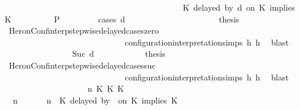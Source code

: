 \begin{isabellebody}
\ \ \ \ \ \ \ \ \ \ \ \ \ \ \ \ \ \ \ \ \ \ \ \ \ \ \ \ \ \ \ \ \ \ \ \ \ \ \ \ {\isasymturnstile}\ {\isasymPsi}\ {\isasymtriangleright}\ {\isacharparenleft}{\isacharparenleft}K\ delayed\ by\ d\ on\ K\ implies\ K\ {\isacharhash}\ {\isasymPhi}{\isacharparenright}{\isacharparenright}{\isacartoucheclose}\isanewline
\ \ \ \ \ \ \isamarkupfalse%
\ {\isacharquery}P\ \isanewline
\ \ \ \ \ \ \isamarkupfalse%
\ {\isacharparenleft}cases\ d{\isacharparenright}\isanewline
\ \ \ \ \ \ \ \ \isamarkupfalse%
\ {}\isanewline
\ \ \ \ \ \ \ \ \ \ \isamarkupfalse%
\ {\isacharquery}thesis\ \isamarkupfalse%
\ HeronConf{\isacharunderscore}interp{\isacharunderscore}stepwise{\isacharunderscore}delayed{\isacharunderscore}cases{\isacharunderscore}zero\isanewline
\ \ \ \ \ \ \ \ \ \ \ \ \ \ \ \ \ \ \ \ \ \ \ \ \ \ \ \ \ configuration{\isacharunderscore}interpretation{\isachardot}simps\ h{}\ h{}\ \isamarkupfalse%
\ blast\isanewline
\ \ \ \ \ \ \isamarkupfalse%
\isanewline
\ \ \ \ \ \ \ \ \isamarkupfalse%
\ {\isacharparenleft}Suc\ d{\isacharprime}{\isacharparenright}\isanewline
\ \ \ \ \ \ \ \ \ \ \isamarkupfalse%
\ {\isacharquery}thesis\ \isamarkupfalse%
\ HeronConf{\isacharunderscore}interp{\isacharunderscore}stepwise{\isacharunderscore}delayed{\isacharunderscore}cases{\isacharunderscore}suc\isanewline
\ \ \ \ \ \ \ \ \ \ \ \ \ \ \ \ \ \ \ \ \ \ \ \ \ \ \ \ \ configuration{\isacharunderscore}interpretation{\isachardot}simps\ h{}\ h{}\ \isamarkupfalse%
\ blast\isanewline
\ \ \ \ \ \ \isamarkupfalse%
\isanewline
\ \ \ \ \isamarkupfalse%
\isanewline
\ \ \ \ \ \ \isamarkupfalse%
\ {\isasymGamma}\ n\ K\ K\ K\ {\isasymPsi}\ {\isasymPhi}\isanewline
\ \ \ \ \ \ \isamarkupfalse%
\ {\isacartoucheopen}{\isacharparenleft}{\isasymGamma}\ n\ {\isasymturnstile}\ {\isasymPsi}\ {\isasymtriangleright}\ {\isasymPhi}\ {\isacharequal}\ {\isacharparenleft}{\isasymGamma}{\isacharcomma}\ n\ {\isasymturnstile}\ {\isacharparenleft}K\ delayed\ by\ {}\ on\ K\ implies\ K\ {\isacharhash}\ {\isasymPsi}\ {\isasymtriangleright}\ {\isasymPhi}{\isacharparenright}{\isacartoucheclose}\isanewline

\end{isabellebody}
